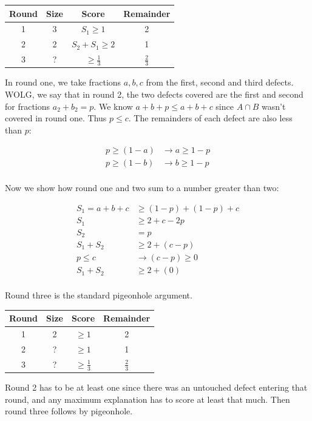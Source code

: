 \begin{tabular}{cccc}\hline
Round & Size & Score & Remainder \\ \hline
1 & 3 & $S_1 \geq 1$ & 2 \\
2 & 2 & $S_2 + S_1 \geq 2$ & 1 \\
3 & ? & $\geq \frac13$ & $\frac23$ \\
\end{tabular}

In round one, we take fractions ${a,b,c}$ from the first, second and third defects.  WOLG, we say that in round 2, the two defects covered are the first and second for fractions $a_2 + b_2 = p$.  We know $a + b + p \leq a + b + c$ since $A \cap B$ wasn't covered in round one.  Thus $p \leq c$.  The remainders of each defect are also less than $p$: 

\begin{eqnarray*}
p \geq (1-a) & \rightarrow a \geq 1-p \\
p \geq (1-b) &\rightarrow b \geq 1-p \\
\end{eqnarray*}

Now we show how round one and two sum to a number greater than two:

\begin{eqnarray*}
S_1 = a+b+c &\geq (1-p) + (1-p) + c \\
S_1 &\geq 2 + c - 2p \\
S_2 &= p \\
S_1 + S_2 &\geq 2 + (c - p) \\
p \leq c &\rightarrow (c-p) \geq 0 \\
S_1 + S_2 &\geq 2 + (0) \\
\end{eqnarray*}

Round three is the standard pigeonhole argument.

\begin{tabular}{cccc}\hline
Round & Size & Score & Remainder \\ \hline
1 & 2 & $\geq 1$ & 2 \\
2 & ? & $\geq 1$ & 1 \\
3 & ? & $\geq \frac13$ & $\frac23$ \\
\end{tabular}

Round 2 has to be at least one since there was an untouched defect entering that round, and any maximum explanation has to score at least that much.  Then round three follows by pigeonhole.

